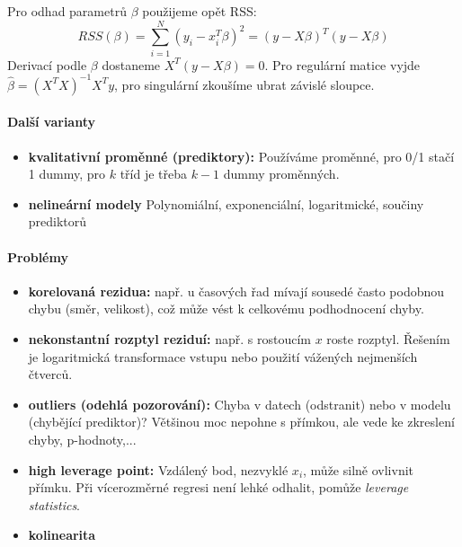 \documentclass[11pt]{report} %
\numberwithin{equation}{section}
\begin{document}
Pro odhad parametrů $\beta$ použijeme opět RSS:
$$RSS(\beta) = \sum_{i=1}^{N}(y_i - x_i^T\beta)^2 = (y-X\beta)^T(y-X\beta)$$
Derivací podle $\beta$ dostaneme $X^T(y-X\beta) = 0$. Pro regulární matice vyjde $\hat{\beta} = (X^TX)^{-1}X^Ty$, pro singulární zkoušíme ubrat závislé sloupce.
		

\paragraph{Další varianty}
\begin{itemize}
\item \textbf{kvalitativní proměnné (prediktory):} Používáme  proměnné, pro 0/1 stačí 1 dummy, pro $k$ tříd je třeba $k-1$ dummy proměnných.

\item \textbf{nelineární modely} Polynomiální, exponenciální, logaritmické, součiny prediktorů
\end{itemize}

\paragraph{Problémy}
\begin{itemize}
	\item \textbf{korelovaná rezidua:} např. u časových řad mívají sousedé často podobnou chybu (směr, velikost), což může vést k celkovému podhodnocení chyby.
	
	\item \textbf{nekonstantní rozptyl reziduí:} např. s rostoucím $x$ roste rozptyl. Řešením je logaritmická transformace vstupu nebo použití vážených nejmenších čtverců.
	
	\item \textbf{outliers (odehlá pozorování):} Chyba v datech (odstranit) nebo v modelu (chybějící prediktor)? Většinou moc nepohne s přímkou, ale vede ke zkreslení chyby, p-hodnoty,... 
	
	\item \textbf{high leverage point:} Vzdálený bod, nezvyklé $x_i$, může silně ovlivnit přímku. Při vícerozměrné regresi není lehké odhalit, pomůže \textit{leverage statistics}.
	
	\item \textbf{kolinearita}
\end{itemize}
\end{document}
